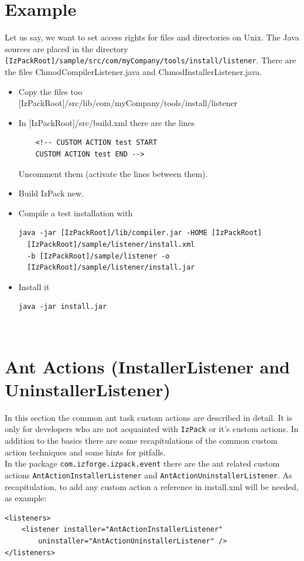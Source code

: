\section{Example}
Let us say, we want to set access rights for files and directories
on Unix. The Java sources are placed in the directory \\
\texttt{[IzPackRoot]/sample/src/com/myCompany/tools/install/listener}.
There are the files ChmodCompilerListener.java and
ChmodInstallerListener.java.
\begin{itemize}
  \item Copy the files too
  [IzPackRoot]/src/lib/com/myCompany/tools/install/listener
  \item In [IzPackRoot]/src/build.xml there are the lines
\footnotesize
\begin{verbatim}
    <!-- CUSTOM ACTION test START
    CUSTOM ACTION test END -->
\end{verbatim}
\normalsize Uncomment them (activate the lines between them).
  \item Build IzPack new.
  \item Compile a test installation with
\footnotesize
\begin{verbatim}
java -jar [IzPackRoot]/lib/compiler.jar -HOME [IzPackRoot]
  [IzPackRoot]/sample/listener/install.xml
  -b [IzPackRoot]/sample/listener -o
  [IzPackRoot]/sample/listener/install.jar
\end{verbatim}
\normalsize
  \item Install it
\footnotesize
\begin{verbatim}
java -jar install.jar
\end{verbatim}
\normalsize
\end{itemize}\


\section{Ant Actions (InstallerListener and UninstallerListener)}
In this section the common ant task custom actions are described
in detail. It is only for developers who are not acquainted 
with \texttt{IzPack} or it's custom actions. In addition to the
basics there are some recapitulations of the common custom
action techniques and some hints for pitfalls.\\
In the package \texttt{com.izforge.izpack.event} there are the ant
related custom actions \texttt{AntActionInstallerListener} and
\texttt{AntActionUninstallerListener}. As recapitulation, to add
any custom action a
reference in install.xml will be needed, as example:\\
\footnotesize
\begin{verbatim}
<listeners>
    <listener installer="AntActionInstallerListener"
        uninstaller="AntActionUninstallerListener" />
</listeners>
\end{verbatim}
\normalsize

